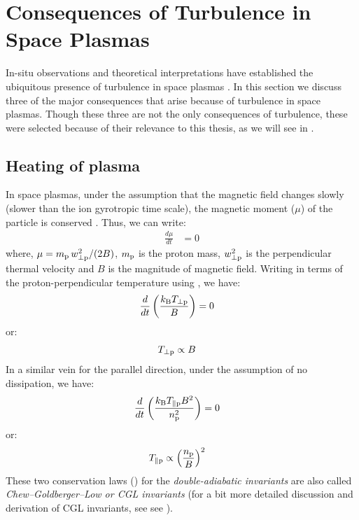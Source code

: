     \section{Consequences of Turbulence in Space Plasmas} \label{sec:inter3b}

        In-situ observations and theoretical interpretations have established the ubiquitous
        presence of turbulence in space plasmas \citep[and references
        therein]{Matthaeus2011,Matthaeus2021}. In this section we discuss three of the major
        consequences that arise because of turbulence in space plasmas. Though these three are not
        the only consequences of turbulence, these were selected because of their relevance to this
        thesis, as we will see in .

        \subsection{Heating of plasma} \label{sec:hop}

            In space plasmas, under the assumption that the magnetic field changes slowly (slower
            than the ion gyrotropic time scale), the magnetic moment ($\mu$) of the particle is
            conserved \citep{Baumjohann1996,Verscharen2019}. Thus, we can write:
            \begin{align}
                \frac{d \mu}{dt} & = 0 \label{eq:mu_0}
            \end{align}
            where, $\mu = m_{\rm p}\,w_{\rm \perp p}^2/(2B)$, $m_{\rm p}$ is the proton mass,
            $w_{\rm \perp p}^2$ is the perpendicular thermal velocity and $B$ is the magnitude of
            magnetic field. Writing  in terms of the proton-perpendicular temperature
            using , we have:
            \begin{align}
                \frac{d}{dt} \left(\frac{k_{\rm B} T_{\rm \perp p}}{B}\right) & = 0 \label{eq:mu_1}
            \end{align}
            or:
            \begin{align}
                T_{\rm \perp p} & \propto B \label{eq:mu_2}
            \end{align}
            In a similar vein for the parallel direction, under the assumption of no dissipation, we
            have:
            \begin{align}
                \frac{d}{dt} \left(\frac{k_{\rm B} T_{\rm \parallel p} B^2}{n_{\rm p}^2}\right) & = 0 \label{eq:mu_3}
            \end{align}
            or:
            \begin{align}
                T_{\rm \parallel p} & \propto \left(\frac{n_{\rm p}}{B}\right)^2 \label{eq:mu_4}
            \end{align}
            These two conservation laws () for the \textit{double-adiabatic
            invariants} are also called \textit{Chew–Goldberger–Low or CGL invariants} (for a bit
            more detailed discussion and derivation of CGL invariants, see see ).

